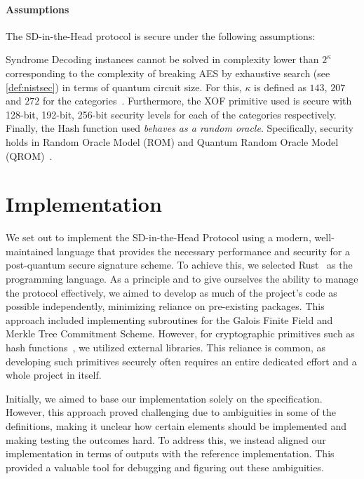 \documentclass[11pt]{report}
\theoremstyle{definition}
\theoremstyle{plain}
\begin{document}
\subsubsection{Assumptions}\label{sec:assumptions}
The SD-in-the-Head protocol is secure under the following assumptions:

Syndrome Decoding instances cannot be solved in complexity lower than $2^\kappa$ corresponding to the complexity of breaking AES by exhaustive search (see \autoref{def:nistsec}) in terms of quantum circuit size. For this, $\kappa$ is defined as $143$, $207$ and $272$ for the categories~\cite{nistcall}. Furthermore, the XOF primitive used is secure with 128-bit, 192-bit, 256-bit security levels for each of the categories respectively. Finally, the Hash function used \textit{behaves as a random oracle}. Specifically, security holds in Random Oracle Model (ROM) and Quantum Random Oracle Model (QROM)~\cite{aguilarsyndrome11}.




\chapter{Implementation}\label{ch:impl}

We set out to implement the SD-in-the-Head Protocol using a modern, well-maintained language that provides the necessary performance and security for a post-quantum secure signature scheme. To achieve this, we selected Rust~\cite{rustlangRustProgramming,nistsaferlanguages,lurklurkEffectiveRust,rustlangPerformanceBook} as the programming language. As a principle and to give ourselves the ability to manage the protocol effectively, we aimed to develop as much of the project's code as possible independently, minimizing reliance on pre-existing packages. This approach included implementing subroutines for the Galois Finite Field and Merkle Tree Commitment Scheme. However, for cryptographic primitives such as hash functions~\cite{blakethree,tinykeccak}, we utilized external libraries. This reliance is common, as developing such primitives securely often requires an entire dedicated effort and a whole project in itself.

Initially, we aimed to base our implementation solely on the specification. However, this approach proved challenging due to ambiguities in some of the definitions, making it unclear how certain elements should be implemented and making testing the outcomes hard. To address this, we instead aligned our implementation in terms of outputs with the reference implementation. This provided a valuable tool for debugging and figuring out these ambiguities.
\end{document}
